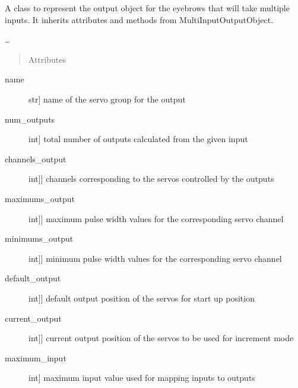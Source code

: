 \documentclass[letterpaper,10pt,english]{sphinxmanual}
\begin{document}
\begin{fulllineitems}
\label{\detokenize{specific:EyebrowsOutput.EyebrowsOutput}}
\sphinxAtStartPar
A class to represent the output object for the eyebrows that will take multiple inputs.
It inherits attributes and methods from MultiInputOutputObject.

\sphinxAtStartPar
…
\begin{quote}\begin{description}
\item[{Attributes}] \leavevmode
\end{description}\end{quote}
\begin{description}
\item[{name}] \leavevmode{[}str{]}
\sphinxAtStartPar
name of the servo group for the output

\item[{num\_outputs}] \leavevmode{[}int{]}
\sphinxAtStartPar
total number of outputs calculated from the given input

\item[{channels\_output}] \leavevmode{[}{[}int{]}{]}
\sphinxAtStartPar
channels corresponding to the servos controlled by the outputs

\item[{maximums\_output}] \leavevmode{[}{[}int{]}{]}
\sphinxAtStartPar
maximum pulse width values for the corresponding servo channel

\item[{minimums\_output}] \leavevmode{[}{[}int{]}{]}
\sphinxAtStartPar
minimum pulse width values for the corresponding servo channel

\item[{default\_output}] \leavevmode{[}{[}int{]}{]}
\sphinxAtStartPar
default output position of the servos for start up position

\item[{current\_output}] \leavevmode{[}{[}int{]}{]}
\sphinxAtStartPar
current output position of the servos to be used for increment mode

\item[{maximum\_input}] \leavevmode{[}int{]}
\sphinxAtStartPar
maximum input value used for mapping inputs to outputs


\end{description}
\end{fulllineitems}
\end{document}
